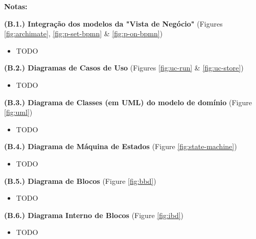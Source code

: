 \documentclass[12pt,a4paper]{article}
\begin{document}
\begin{tcolorbox}[enhanced jigsaw,colback=bg,boxrule=0pt,arc=4pt]
  \begin{large}
    \textbf{Notas:}
  \end{large}

  \begin{small}
    \textbf{(B.1.) Integração dos modelos da "Vista de Negócio"} (Figures \ref{fig:archimate}, \ref{fig:p-set-bpmn} \& \ref{fig:p-on-bpmn})
  \end{small}
  \begin{itemize}
    \item TODO
  \end{itemize}

  \begin{small}
    \textbf{(B.2.) Diagramas de Casos de Uso} (Figures \ref{fig:uc-run} \& \ref{fig:uc-store})
  \end{small}
  \begin{itemize}
    \item TODO
  \end{itemize}

  \begin{small}
    \textbf{(B.3.) Diagrama de Classes (em UML) do modelo de domínio} (Figure \ref{fig:uml})
  \end{small}
  \begin{itemize}
    \item TODO
  \end{itemize}

  \begin{small}
    \textbf{(B.4.) Diagrama de Máquina de Estados} (Figure \ref{fig:state-machine})
  \end{small}
  \begin{itemize}
    \item TODO
  \end{itemize}

  \begin{small}
    \textbf{(B.5.) Diagrama de Blocos} (Figure \ref{fig:bbd})
  \end{small}
  \begin{itemize}
    \item TODO
  \end{itemize}

  \begin{small}
    \textbf{(B.6.) Diagrama Interno de Blocos} (Figure \ref{fig:ibd})
  \end{small}
  \begin{itemize}
    \item TODO
  \end{itemize}
\end{tcolorbox}
\end{document}
